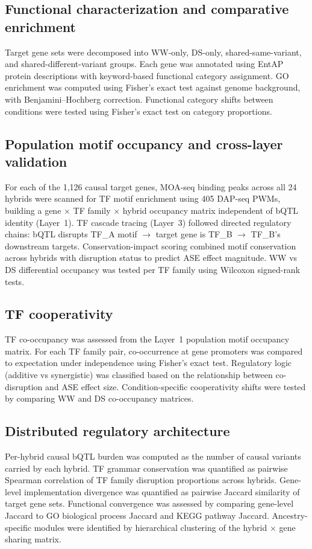\documentclass[11pt,a4paper]{article}
\begin{document}
\subsection{Functional characterization and comparative enrichment}
Target gene sets were decomposed into WW-only, DS-only, shared-same-variant,
and shared-different-variant groups. Each gene was annotated using EntAP
protein descriptions with keyword-based functional category assignment.
GO enrichment was computed using Fisher's exact test against genome
background, with Benjamini--Hochberg correction. Functional category shifts
between conditions were tested using Fisher's exact test on category
proportions.

\subsection{Population motif occupancy and cross-layer validation}
For each of the 1,126 causal target genes, MOA-seq binding peaks across all
24 hybrids were scanned for TF motif enrichment using 405 DAP-seq PWMs,
building a gene $\times$ TF family $\times$ hybrid occupancy matrix
independent of bQTL identity (Layer~1). TF cascade tracing (Layer~3) followed
directed regulatory chains: bQTL disrupts TF\_A motif $\to$ target gene is
TF\_B $\to$ TF\_B's downstream targets. Conservation-impact scoring combined
motif conservation across hybrids with disruption status to predict ASE
effect magnitude. WW vs DS differential occupancy was tested per TF family
using Wilcoxon signed-rank tests.

\subsection{TF cooperativity}
TF co-occupancy was assessed from the Layer~1 population motif occupancy
matrix. For each TF family pair, co-occurrence at gene promoters was compared
to expectation under independence using Fisher's exact test. Regulatory logic
(additive vs synergistic) was classified based on the relationship between
co-disruption and ASE effect size. Condition-specific cooperativity shifts
were tested by comparing WW and DS co-occupancy matrices.

\subsection{Distributed regulatory architecture}
Per-hybrid causal bQTL burden was computed as the number of causal variants
carried by each hybrid. TF grammar conservation was quantified as pairwise
Spearman correlation of TF family disruption proportions across hybrids.
Gene-level implementation divergence was quantified as pairwise Jaccard
similarity of target gene sets. Functional convergence was assessed by
comparing gene-level Jaccard to GO biological process Jaccard and KEGG
pathway Jaccard. Ancestry-specific modules were identified by hierarchical
clustering of the hybrid $\times$ gene sharing matrix.
\end{document}
